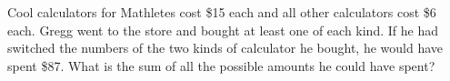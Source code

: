 Cool calculators for Mathletes cost \$15 each and all other calculators cost \$6 each. Gregg went to the store and bought at least one of each kind. If he had switched the numbers of the two kinds of calculator he bought, he would have spent \$87. What is the sum of all the possible amounts he could have spent?
